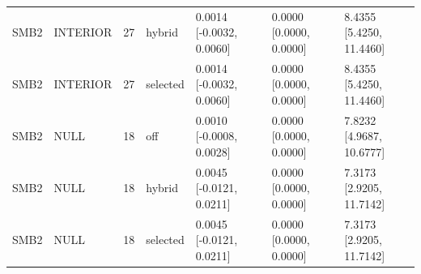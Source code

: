 \begin{tabular}{lllllll}
SMB2 & INTERIOR & 27 & hybrid & 0.0014 [-0.0032, 0.0060] & 0.0000 [0.0000, 0.0000] & 8.4355 [5.4250, 11.4460] \\
SMB2 & INTERIOR & 27 & selected & 0.0014 [-0.0032, 0.0060] & 0.0000 [0.0000, 0.0000] & 8.4355 [5.4250, 11.4460] \\
SMB2 & NULL & 18 & off & 0.0010 [-0.0008, 0.0028] & 0.0000 [0.0000, 0.0000] & 7.8232 [4.9687, 10.6777] \\
SMB2 & NULL & 18 & hybrid & 0.0045 [-0.0121, 0.0211] & 0.0000 [0.0000, 0.0000] & 7.3173 [2.9205, 11.7142] \\
SMB2 & NULL & 18 & selected & 0.0045 [-0.0121, 0.0211] & 0.0000 [0.0000, 0.0000] & 7.3173 [2.9205, 11.7142] \\
\hline
\end{tabular}
